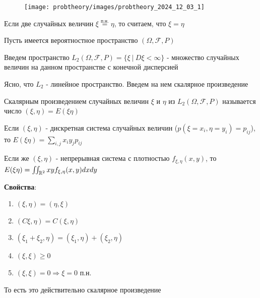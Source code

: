\documentclass[12pt]{article}
\begin{document}
\begin{minipage}{\textwidth}
    \begin{figure}
        \texttt{[image: probtheory/images/probtheory\_2024\_12\_03\_1]}
    \end{figure}

    \Nota Если две случайных величин $\xi \overset{\text{п.н.}}{=} \eta$, то считаем, что $\xi = \eta$

    \hypertarget{spaceofrandomvariables}{}

    Пусть имеется вероятностное пространство $(\Omega, \mathcal{F}, P)$

    Введем пространство $L_2 (\Omega, \mathcal{F}, P) = \{\xi \ | \ D\xi < \infty\}$ - множество случайных величин 
    на данном пространстве с конечной дисперсией

    Ясно, что $L_2$ - линейное пространство. Введем на нем скалярное произведение

    \hypertarget{scalarproductoftwovariables}{}

    \Def Скалярным произведением случайных величин $\xi$ и $\eta$ из $L_2(\Omega, \mathcal{F}, P)$ 
    называется число $(\xi, \eta) = E(\xi\eta)$

    \Nota Если $(\xi, \eta)$ - дискретная система случайных величин ($p(\xi = x_i, \eta = y_i) = p_{ij}$), 
    то $E(\xi\eta) = \sum_{i, j} x_i y_j p_{ij}$
\end{minipage}

Если же $(\xi, \eta)$ - непрерывная система с плотностью $f_{\xi, \eta}(x, y)$, 
то $E(\xi\eta) = \iint_{\mathbb{R}^2} xy f_{\xi, \eta}(x, y) dxdy$

\mediumvspace

\textbf{Свойства}:

\begin{enumerate}
    \item $(\xi, \eta) = (\eta, \xi)$

    \item $(C\xi, \eta) = C(\xi, \eta)$

    \item $(\xi_1 + \xi_2, \eta) = (\xi_1, \eta) + (\xi_2, \eta)$

    \item $(\xi, \xi) \geq 0$

    \item $(\xi, \xi) = 0 \Longrightarrow \xi = 0$ п.н.
\end{enumerate}

То есть это действительно скалярное произведение
\end{document}
